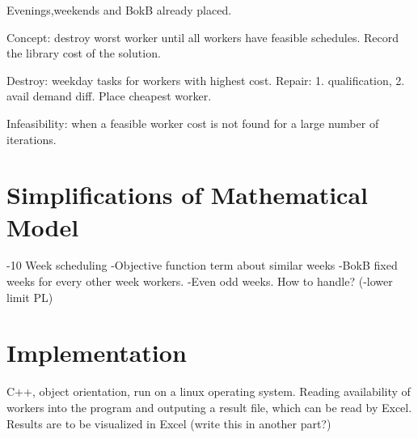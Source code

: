 Evenings,weekends and BokB already placed.

Concept: destroy worst worker until all workers have feasible schedules. Record the library cost of the solution.

Destroy: weekday tasks for workers with highest cost.
Repair: 1. qualification, 2. avail demand diff. Place cheapest worker.

Infeasibility: when a feasible worker cost is not found for a large number of iterations.

\section{Simplifications of Mathematical Model}
-10 Week scheduling
-Objective function term about similar weeks
-BokB fixed weeks for every other week workers.
-Even odd weeks. How to handle?
(-lower limit PL)

\section{Implementation}
C++, object orientation, run on a linux operating system. Reading availability of workers into the program and outputing a result file, which can be read by Excel. Results are to be visualized in Excel (write this in another part?)